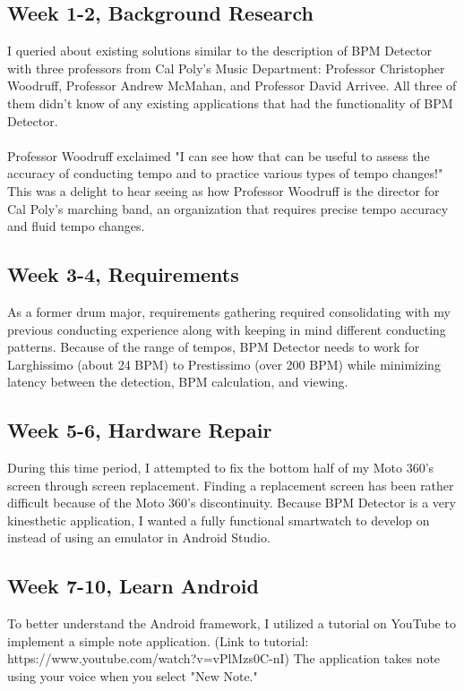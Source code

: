 \documentclass[12pt]{article}
\begin{document}
\subsection{Week 1-2, Background Research}
I queried about existing solutions similar to the description of BPM Detector with three professors from Cal Poly's Music Department: Professor Christopher Woodruff, Professor Andrew McMahan, and Professor David Arrivee. All three of them didn't know of any existing applications that had the functionality of BPM Detector. 
\\
\\
Professor Woodruff exclaimed "I can see how that can be useful to assess the accuracy of conducting tempo and to practice various types of tempo changes!" This was a delight to hear seeing as how Professor Woodruff is the director for Cal Poly's marching band, an organization that requires precise tempo accuracy and fluid tempo changes. 

\subsection{Week 3-4, Requirements}
As a former drum major, requirements gathering required consolidating with my previous conducting experience along with keeping in mind different conducting patterns. Because of the range of tempos, BPM Detector needs to work for Larghissimo (about 24 BPM) to Prestissimo (over 200 BPM) while minimizing latency between the detection, BPM calculation, and viewing.

\subsection{Week 5-6, Hardware Repair}
During this time period, I attempted to fix the bottom half of my Moto 360's screen through screen replacement. Finding a replacement screen has been rather difficult because of the Moto 360's discontinuity. Because BPM Detector is a very kinesthetic application, I wanted a fully functional smartwatch to develop on instead of using an emulator in Android Studio.

\subsection{Week 7-10, Learn Android}
To better understand the Android framework, I utilized a tutorial on YouTube to implement a simple note application. (Link to tutorial: https://www.youtube.com/watch?v=vPlMzs0C-nI) The application takes note using your voice when you select "New Note."
\end{document}
